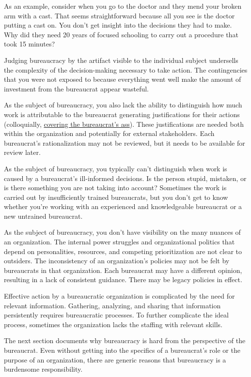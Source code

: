 As an example, consider when you go to the doctor and they mend your broken arm with a cast. That seems straightforward because all you see is the doctor putting a cast on. You don't get insight into the decisions they had to make. Why did they need 20 years of focused schooling to carry out a procedure that took 15 minutes?

Judging bureaucracy by the artifact visible to the individual subject undersells the complexity of the decision-making necessary to take action. The contingencies that you were not exposed to because everything went well make the amount of investment from the bureaucrat appear wasteful.

As the subject of bureaucracy, you also lack the ability to distinguish how much work is attributable to the bureaucrat generating justifications for their actions (colloquially, \href{https://en.wikipedia.org/wiki/Cover_your_ass}{covering the bureaucrat's ass}). 
\iftoggle{WPinmargin}{\marginpar{$>$Wikipedia: Cover your ass}}{}
These justifications are needed both within the organization and potentially for external stakeholders. Each bureaucrat's rationalization may not be reviewed, but it needs to be available for review later.

As the subject of bureaucracy, you typically can't distinguish when work is caused by a bureaucrat's ill-informed decisions. Is the person stupid, mistaken, or is there something you are not taking into account?
Sometimes the work is carried out by insufficiently trained bureaucrats, but you don't get to know whether you're working with an experienced and knowledgeable bureaucrat or a new untrained bureaucrat. 

As the subject of bureaucracy, you don't have visibility on the many nuances of an organization. The internal power struggles and organizational politics that depend on personalities, resources, and competing prioritization are not clear to outsiders.
The inconsistency of an organization's policies may not be felt by bureaucrats in that organization. Each bureaucrat may have a different opinion, resulting in a lack of consistent guidance.
There may be legacy policies in effect.

Effective action by a bureaucratic organization is complicated by the need for relevant information. Gathering, analyzing, and sharing that information persistently requires bureaucratic processes. To further complicate the ideal process, sometimes the organization lacks the staffing with relevant skills. 


The next section documents why bureaucracy is hard from the perspective of the bureaucrat. Even without getting into the specifics of a bureaucrat's role or the purpose of an organization, there are generic reasons that bureaucracy is a burdensome responsibility.